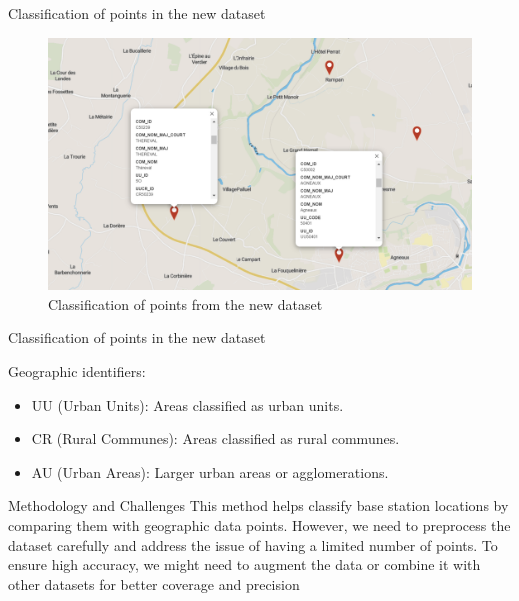 \begin{frame}{Classification of points in the new dataset}
    \begin{figure}
        \includegraphics[height=0.6\paperheight]{images/Geo_approach/New_dataset_points_ill.png}
        \caption{Classification of points from the new dataset}
    \end{figure}
\end{frame}
\begin{frame}{Classification of points in the new dataset}
    \begin{block}{Geographic identifiers:}
        \begin{itemize}
        \item UU (Urban Units): Areas classified as urban units.
        \item CR (Rural Communes): Areas classified as rural communes.
        \item AU (Urban Areas): Larger urban areas or agglomerations.
        \end{itemize}
    \end{block}
    \begin{block}{Methodology and Challenges}
            This method helps classify base station locations by comparing them with geographic data points. However, we need to preprocess the dataset carefully and address the issue of having a limited number of points. To ensure high accuracy, we might need to augment the data or combine it with other datasets for better coverage and precision
    \end{block}
\end{frame}